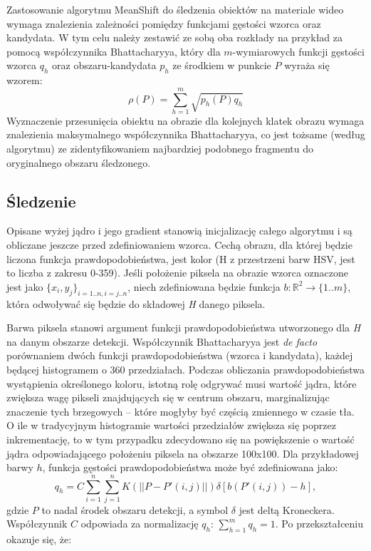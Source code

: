 Zastosowanie algorytmu MeanShift do śledzenia obiektów na materiale
wideo wymaga znalezienia zależności pomiędzy funkcjami gęstości wzorca oraz kandydata. 
W tym celu należy zestawić ze sobą oba rozkłady na przykład za pomocą współczynnika Bhattacharyya, który dla $m$-wymiarowych funkcji gęstości wzorca $q_h$ oraz obszaru-kandydata $p_h$ ze środkiem w punkcie $P$ wyraża się wzorem:
\begin{equation}
\label{eq:Bhat}
\rho(P)=\sum_{h=1}^{m}\sqrt{p_h(P)q_h}
\end{equation}
Wyznaczenie przesunięcia obiektu na obrazie dla kolejnych klatek obrazu wymaga znalezienia maksymalnego współczynnika Bhattacharyya, co jest tożsame (według algorytmu) ze zidentyfikowaniem najbardziej podobnego fragmentu do oryginalnego obszaru śledzonego.

\subsection{Śledzenie}

Opisane wyżej jądro i jego gradient stanowią inicjalizację całego algorytmu i są obliczane jeszcze przed zdefiniowaniem wzorca. 
Cechą obrazu, dla której będzie liczona funkcja prawdopodobieństwa, jest kolor (H z przestrzeni barw HSV, jest to liczba z zakresu 0-359). 
Jeśli położenie piksela na obrazie wzorca oznaczone jest jako $\{x_{i},y_{j}\}_{i=1..n,i=j..n}$, niech zdefiniowana będzie funkcja $b:\mathbb{R}^2\rightarrow\{1..m\}$, która odwoływać się będzie do składowej \textit{H} danego piksela.

Barwa piksela stanowi argument funkcji prawdopodobieństwa utworzonego dla \textit{H} na danym obszarze detekcji. %
Współczynnik Bhattacharyya jest \textit{de facto} porównaniem dwóch funkcji prawdopodobieństwa (wzorca i kandydata), każdej będącej histogramem o 360 przedziałach. %
Podczas obliczania prawdopodobieństwa wystąpienia określonego koloru, istotną rolę odgrywać musi wartość jądra, które zwiększa wagę pikseli znajdujących się w centrum obszaru, marginalizując znaczenie tych brzegowych -- które mogłyby być częścią zmiennego w czasie tła. 
O ile w tradycyjnym histogramie wartości przedziałów zwiększa się poprzez inkrementację, to w tym przypadku zdecydowano się na powiększenie o wartość jądra odpowiadającego położeniu piksela na obszarze 100x100.
Dla przykładowej barwy $h$, funkcja gęstości prawdopodobieństwa może być zdefiniowana jako:
\begin{equation}
q_h=C\sum_{i=1}^{n}\sum_{j=1}^{n}K(||P-P'(i,j)||)\delta[b(P'(i,j))-h],
\end{equation}
gdzie $P$ to nadal środek obszaru detekcji, a symbol $\delta$ jest deltą Kroneckera. Współczynnik $C$ odpowiada za normalizację $q_h$: $\sum_{h=1}^{m}q_h=1$.
Po przekształceniu okazuje się, że:


